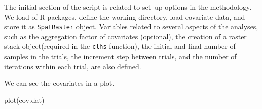 \documentclass[
  10pt,
  b5paper,
  oneside]{book}
\newenvironment{Shaded}{\begin{snugshade}}{\end{snugshade}}
\newcommand{\AttributeTok}[1]{\textcolor[rgb]{0.77,0.63,0.00}{#1}}
\newcommand{\CommentTok}[1]{\textcolor[rgb]{0.56,0.35,0.01}{\textit{#1}}}
\newcommand{\ConstantTok}[1]{\textcolor[rgb]{0.00,0.00,0.00}{#1}}
\newcommand{\DocumentationTok}[1]{\textcolor[rgb]{0.56,0.35,0.01}{\textbf{\textit{#1}}}}
\newcommand{\FunctionTok}[1]{\textcolor[rgb]{0.00,0.00,0.00}{#1}}
\newcommand{\NormalTok}[1]{#1}
\newcommand{\OtherTok}[1]{\textcolor[rgb]{0.56,0.35,0.01}{#1}}
\newcommand{\SpecialCharTok}[1]{\textcolor[rgb]{0.00,0.00,0.00}{#1}}
\newcommand{\StringTok}[1]{\textcolor[rgb]{0.31,0.60,0.02}{#1}}
\begin{document}
The initial section of the script is related to set--up options in the methodology. We load of R packages, define the working directory, load covariate data, and store it as \texttt{SpatRaster} object. Variables related to several aspects of the analyses, such as the aggregation factor of covariates (optional), the creation of a raster stack object(required in the \texttt{clhs} function), the initial and final number of samples in the trials, the increment step between trials, and the number of iterations within each trial, are also defined.

\begin{Shaded}
\end{Shaded}

We can see the covariates in a plot.

\begin{Shaded}
\begin{Highlighting}[]
   \FunctionTok{plot}\NormalTok{(cov.dat)}
\end{Highlighting}
\end{Shaded}
\end{document}

